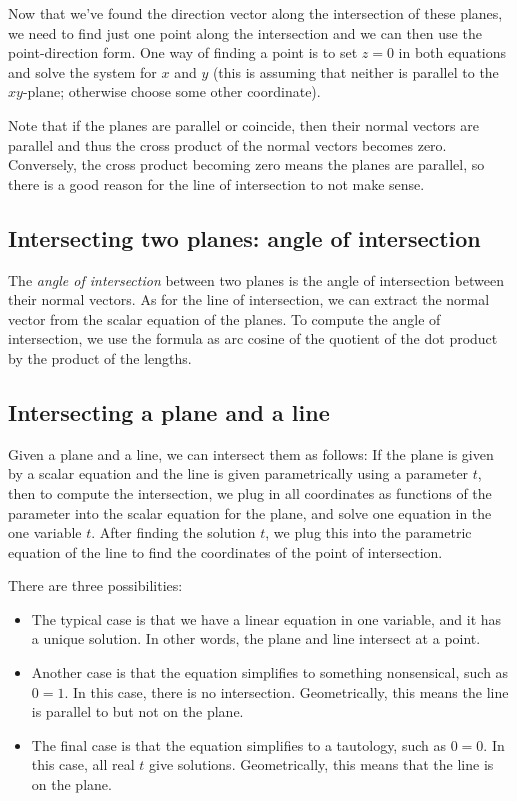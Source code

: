\documentclass[10pt]{amsart}
\begin{document}
Now that we've found the direction vector along the intersection of
these planes, we need to find just one point along the intersection
and we can then use the point-direction form. One way of finding a
point is to set $z = 0$ in both equations and solve the system for $x$
and $y$ (this is assuming that neither is parallel to the $xy$-plane;
otherwise choose some other coordinate).

Note that if the planes are parallel or coincide, then their normal
vectors are parallel and thus the cross product of the normal vectors
becomes zero. Conversely, the cross product becoming zero means the
planes are parallel, so there is a good reason for the line of
intersection to not make sense.

\subsection{Intersecting two planes: angle of intersection}

The {\em angle of intersection} between two planes is the angle of
intersection between their normal vectors. As for the line of
intersection, we can extract the normal vector from the scalar
equation of the planes. To compute the angle of intersection, we use
the formula as arc cosine of the quotient of the dot product by the
product of the lengths.

\subsection{Intersecting a plane and a line}

Given a plane and a line, we can intersect them as follows: If the
plane is given by a scalar equation and the line is given
parametrically using a parameter $t$, then to compute the
intersection, we plug in all coordinates as functions of the parameter
into the scalar equation for the plane, and solve one equation in the
one variable $t$. After finding the solution $t$, we plug this into
the parametric equation of the line to find the coordinates of the
point of intersection.

There are three possibilities:

\begin{itemize}
\item The typical case is that we have a linear equation in one
  variable, and it has a unique solution. In other words, the plane
  and line intersect at a point.
\item Another case is that the equation simplifies to something
  nonsensical, such as $0 = 1$. In this case, there is no
  intersection. Geometrically, this means the line is parallel to but
  not on the plane.
\item The final case is that the equation simplifies to a tautology,
  such as $0 = 0$. In this case, all real $t$ give
  solutions. Geometrically, this means that the line is on the plane.
\end{itemize}
\end{document}
